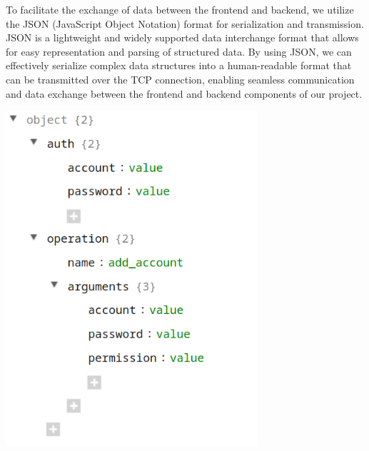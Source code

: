 {{		To facilitate the exchange of data between the frontend and backend, we
		utilize the JSON (JavaScript Object Notation) format for serialization
		and transmission. JSON is a lightweight and widely supported data
		interchange format that allows for easy representation and parsing of
		structured data. By using JSON, we can effectively serialize complex
		data structures into a human-readable format that can be transmitted
		over the TCP connection, enabling seamless communication and data
		exchange between the frontend and backend components of our project.
		\begin{center}
			\centering
			\includegraphics[width=0.7\textwidth]{pics/4.png}
		\end{center}
	}
	\newpage
}
